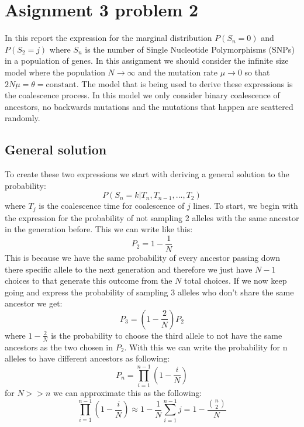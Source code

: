 \documentclass[15pt]{article}
\begin{document}
\section{Asignment 3 problem 2}
In this report the expression for the marginal distribution $P(S_n = 0)$ and $P(S_2 = j)$ where $S_n$ is the number of Single Nucleotide Polymorphisms (SNPs) in a population of genes. In this assignment we should consider the infinite size model where the population $N \rightarrow \infty$ and the mutation rate $\mu \rightarrow 0$ so that $2N\mu = \theta = \text{constant}$. The model that is being used to derive these expressions is the coalescence process. In this model we only consider binary coalescence of ancestors, no backwards mutations and the mutations that happen are scattered randomly.

\subsection{General solution}
To create these two expressions we start with deriving a general solution to the probability:
\begin{equation}
	P(S_n = k| T_n, T_{n-1}, ... , T_2)
\end{equation}
where $T_j$ is the coalescence time for coalescence of $j$ lines. To start, we begin with the expression for the probability of not sampling 2 alleles with the same ancestor in the generation before. This we can write like this:
\begin{equation}
	P_2 = 1 - \frac{1}{N}
\end{equation}
This is because we have the same probability of every ancestor passing down there specific allele to the next generation and therefore we just have $N-1$ choices to that generate this outcome from the $N$ total choices. If we now keep going and express the probability of sampling 3 alleles who don't share the same ancestor we get:
\begin{equation}
	P_3 = (1-\frac{2}{N})P_2
\end{equation}
where $1-\frac{2}{N}$ is the probability to choose the third allele to not have the same ancestors as the two chosen in $P_2$.
With this we can write the probability for n alleles to have different ancestors as following:
\begin{equation}
	P_n = \prod_{i=1}^{n-1} (1 - \frac{i}{N})
\end{equation}
for $N>>n$ we can approximate this as the following:
\begin{equation}
	\prod_{i=1}^{n-1} (1 - \frac{i}{N}) \approx 1 - \frac{1}{N} \sum_{i=1}^{n-1}j = 1-\frac{\binom{n}{2}}{N}
\end{equation}
\end{document}
